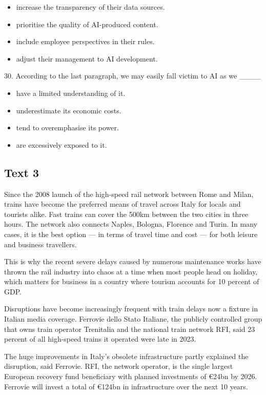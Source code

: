 \documentclass[UTF8,11pt]{ctexart}
\begin{document}
\begin{itemize}[leftmargin=2em,itemsep=.2em,topsep=.4em]\item[A.] increase the transparency of their data sources.
\item[B.] prioritise the quality of AI-produced content.
\item[C.] include employee perspectives in their rules.
\item[D.] adjust their management to AI development.
\end{itemize}

30. According to the last paragraph, we may easily fall victim to AI as we \_\_\_\_


\begin{itemize}[leftmargin=2em,itemsep=.2em,topsep=.4em]\item[A.] have a limited understanding of it.
\item[B.] underestimate its economic costs.
\item[C.] tend to overemphasise its power.
\item[D.] are excessively exposed to it.
\end{itemize}

\subsection*{\textbf{Text 3}}


Since the 2008 launch of the high-speed rail network between Rome and Milan, trains have become the preferred means of travel across Italy for locals and tourists alike. Fast trains can cover the 500km between the two cities in three hours. The network also connects Naples, Bologna, Florence and Turin. In many cases, it is the best option — in terms of travel time and cost — for both leisure and business travellers.


This is why the recent severe delays caused by numerous maintenance works have thrown the rail industry into chaos at a time when most people head on holiday, which matters for business in a country where tourism accounts for 10 percent of GDP.


Disruptions have become increasingly frequent with train delays now a fixture in Italian media coverage. Ferrovie dello Stato Italiane, the publicly controlled group that owns train operator Trenitalia and the national train network RFI, said 23 percent of all high-speed trains it operated were late in 2023.


The huge improvements in Italy’s obsolete infrastructure partly explained the disruption, said Ferrovie. RFI, the network operator, is the single largest European recovery fund beneficiary with planned investments of €24bn by 2026. Ferrovie will invest a total of €124bn in infrastructure over the next 10 years.
\end{document}
